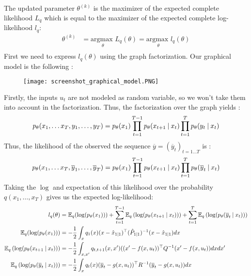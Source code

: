 The updated parameter $\theta^{(k)}$ is the maximizer of the expected complete likelihood $L_q$ which is equal to the maximizer of the expected complete log-likelihood $l_q$:
\begin{align*}
  \theta^{(k)} &= \underset{\theta}{\text{argmax }}L_q(\theta) = \underset{\theta}{\text{argmax }}l_q(\theta)\\
\end{align*}
First we need to express $l_q(\theta)$ using the graph factorization.
Our graphical model is the following :
\begin{figure}[H]
	\texttt{[image: screenshot\_graphical\_model.PNG]}
\end{figure}
Firstly, the inputs $u_t$ are not modeled as random variable, so we won't take them into account in the factorization.
Thus, the factorization over the graph yields :
\begin{align*}
p_{\theta}(x_1, \ldots x_T, y_1, \ldots , y_T) &= p_{\theta}(x_1) \prod_{t=1}^{T-1}{p_{\theta}(x_{t+1} \mathbin{\vert} x_t)} \prod_{t=1}^{T}{p_{\theta}(y_t \mathbin{\vert} x_t)}\\
\end{align*}
Thus, the likelihood of the observed the sequence $\overline{y} = (\overline{y}_t)_{t=1 \ldots T}$ is :
\begin{align*}
  p_{\theta}(x_1, \ldots x_T, \overline{y}_1, \ldots , \overline{y}_T) &= p_{\theta}(x_1) \prod_{t=1}^{T-1}{p_{\theta}(x_{t+1}\mathbin{\vert} x_t)} \prod_{t=1}^{T}{p_{\theta}(\overline{y}_t \mathbin{\vert} x_t)}\\
\end{align*}
Taking the $\log$ and expectation of this likelihood over the probability $q \left(x_1, \ldots ,x_T \right)$ gives us the expected log-likelihood:
\begin{align*}
  l_q(\theta) & =
    \mathbb{E}_q(\log(p_{\theta}(x_1))) +
    \sum_{t=1}^{T-1}{\mathbb{E}_q \left( \log(p_{\theta}(x_{t+1} \mathbin{\vert} x_t)) \right)} +
    \sum_{t=1}^{T}{\mathbb{E}_q\left( \log(p_{\theta}(\overline{y}_t \mathbin{\vert} x_t)) \right)}
  \\
  \mathbb{E}_q(\log(p_{\theta}(x_1))) &= -\frac{1}{2}\int_x{q_1(x) (x - \hat{x}_{1 \mathbin{\vert} 1})^{\top} (\hat{P}_{1 \mathbin{\vert} 1})^{-1} (x - \hat{x}_{1 \mathbin{\vert} 1}) dx}
  \\
  \mathbb{E}_q \left( \log(p_{\theta}(x_{t+1} \mathbin{\vert} x_t)) \right) &= -\frac{1}{2}\int_{x,x'}{q_{t,t+1}(x, x') ((x' - f(x,u_t))^{\top} Q^{-1} (x' - f(x,u_t)) dxdx'}\\
  \mathbb{E}_q\left( \log(p_{\theta}(\overline{y}_t \mathbin{\vert} x_t)) \right) &= -\frac{1}{2}\int_x{q_t(x) (\overline{y}_t - g(x, u_t))^{\top} R^{-1} (\overline{y}_t - g(x, u_t)) dx}\\
\end{align*}

